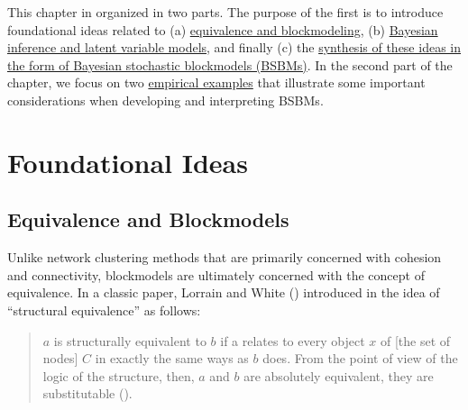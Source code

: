 \documentclass[
  12pt,
  a4paper,
  DIV=11,
  numbers=noendperiod,
  twoside,
  open=any]{scrartcl}
\begin{document}
This chapter in organized in two parts. The purpose of the first is to
introduce foundational ideas related to (a)
\hyperref[equivalence-and-blockmodels]{equivalence and blockmodeling},
(b)
\hyperref[the-logic-of-bayesian-inference-and-latent-variable-models]{Bayesian
inference and latent variable models}, and finally (c) the
\hyperref[the-synthesis-hierarchical-bayesian-stochastic-blockmodels]{synthesis
of these ideas in the form of Bayesian stochastic blockmodels (BSBMs)}.
In the second part of the chapter, we focus on two
\hyperref[empirical-examples]{empirical examples} that illustrate some
important considerations when developing and interpreting BSBMs.

\section{Foundational Ideas}\label{foundational-ideas}

\subsection{Equivalence and
Blockmodels}\label{equivalence-and-blockmodels}

Unlike network clustering methods that are primarily concerned with
cohesion and connectivity, blockmodels are ultimately concerned with the
concept of equivalence. In a classic paper, Lorrain and White
() introduced in the idea of
``structural equivalence'' as follows:

\begin{quote}
\(a\) is structurally equivalent to \(b\) if a relates to every object
\(x\) of {[}the set of nodes{]} \(C\) in exactly the same ways as \(b\)
does. From the point of view of the logic of the structure, then, \(a\)
and \(b\) are absolutely equivalent, they are substitutable
().
\end{quote}
\end{document}
